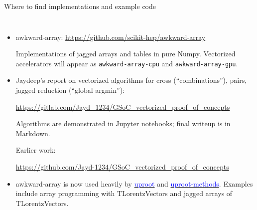 \documentclass[aspectratio=169]{beamer}
\begin{document}
\begin{frame}{Where to find implementations and example code}
\vspace{0.3 cm}
\begin{columns}
\begin{itemize}\setlength{\itemsep}{0.5 cm}
\item awkward-array: \textcolor{blue}{\normalsize\url{https://github.com/scikit-hep/awkward-array}}

\vspace{0.25 cm}
Implementations of jagged arrays and tables in pure Numpy. Vectorized accelerators will appear as {\tt\normalsize awkward-array-cpu} and {\tt\normalsize awkward-array-gpu}.

\item Jaydeep's report on vectorized algorithms for cross (``combinations''), pairs, jagged reduction (``global argmin''):

\vspace{0.25 cm}
\textcolor{blue}{\normalsize\url{https://gitlab.com/Jayd_1234/GSoC_vectorized_proof_of_concepts}}

\vspace{0.25 cm}
Algorithms are demonstrated in Jupyter notebooks; final writeup is in Markdown.

Earlier work:

\vspace{0.25 cm}
\textcolor{blue}{\normalsize\url{https://github.com/Jayd-1234/GSoC_vectorized_proof_of_concepts}}

\item awkward-array is now used heavily by \href{https://github.com/scikit-hep/uproot}{\textcolor{blue}{uproot}} and \href{https://github.com/scikit-hep/uproot-methods}{\textcolor{blue}{uproot-methods}}. Examples include array programming with TLorentzVectors and jagged arrays of TLorentzVectors.
\end{itemize}
\end{columns}
\end{frame}
\end{document}
